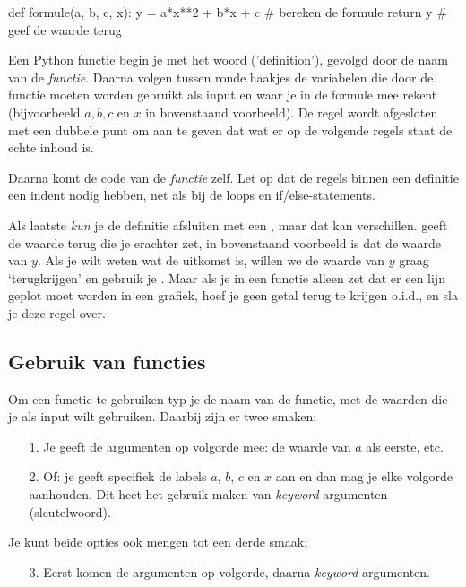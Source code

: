 \documentclass[a4paper,11pt, fleqn]{article}
\begin{document}
\begin{python}
def formule(a, b, c, x):
	y = a*x**2 + b*x + c   # bereken de formule
	return y               # geef de waarde terug
\end{python} 

Een Python functie begin je met het woord  ('definition'), gevolgd door de naam van de \textit{functie}. Daarna volgen tussen ronde haakjes de variabelen die door de functie moeten worden gebruikt als input en waar je in de formule mee rekent (bijvoorbeeld $a, b, c$ en $x$ in bovenstaand voorbeeld). De regel wordt afgesloten met een dubbele punt om aan te geven dat wat er op de volgende regels staat de echte inhoud is. 

Daarna komt de code van de \textit{functie} zelf. Let op dat de regels binnen een definitie een indent nodig hebben, net als bij de loops en if/else-statements.

Als laatste {\it kun} je de definitie afsluiten met een , maar dat kan verschillen.  geeft de waarde terug die je erachter zet, in bovenstaand voorbeeld is dat de waarde van $y$. Als je wilt weten wat de uitkomst is, willen we de waarde van $y$ graag `terugkrijgen' en gebruik je . Maar als je in een functie alleen zet dat er een lijn geplot moet worden in een grafiek, hoef je geen getal terug te krijgen o.i.d., en sla je deze regel over.

\subsection{Gebruik van functies}
Om een functie te gebruiken typ je de naam van de functie, met de waarden die je als input wilt gebruiken. Daarbij zijn er twee smaken:

\begin{itemize}
	\item[1.] Je geeft de argumenten op volgorde mee: de waarde van $a$ als eerste, etc.
	\item[2.] Of: je geeft specifiek de labels $a$, $b$, $c$ en $x$ aan en dan mag je elke volgorde aanhouden. Dit heet het gebruik maken van {\it keyword} argumenten (sleutelwoord).
\end{itemize}

Je kunt beide opties ook mengen tot een derde smaak:

\begin{itemize}
	\item[3.] Eerst komen de argumenten op volgorde, daarna {\it keyword} argumenten.
\end{itemize}
\end{document}

